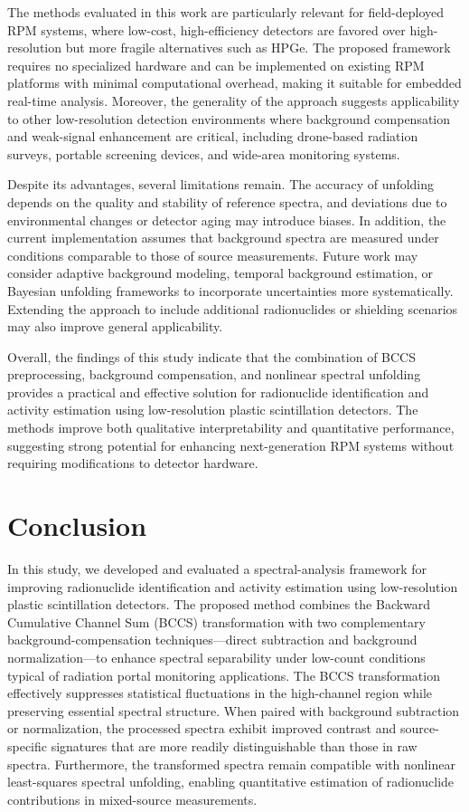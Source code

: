 \documentclass[10pt]{wlscirep}
\begin{document}
The methods evaluated in this work are particularly relevant for field-deployed RPM systems, where low-cost, high-efficiency detectors are favored over high-resolution but more fragile alternatives such as HPGe. The proposed framework requires no specialized hardware and can be implemented on existing RPM platforms with minimal computational overhead, making it suitable for embedded real-time analysis. Moreover, the generality of the approach suggests applicability to other low-resolution detection environments where background compensation and weak-signal enhancement are critical, including drone-based radiation surveys, portable screening devices, and wide-area monitoring systems.

Despite its advantages, several limitations remain. The accuracy of unfolding depends on the quality and stability of reference spectra, and deviations due to environmental changes or detector aging may introduce biases. In addition, the current implementation assumes that background spectra are measured under conditions comparable to those of source measurements. Future work may consider adaptive background modeling, temporal background estimation, or Bayesian unfolding frameworks to incorporate uncertainties more systematically. Extending the approach to include additional radionuclides or shielding scenarios may also improve general applicability.

Overall, the findings of this study indicate that the combination of BCCS preprocessing, background compensation, and nonlinear spectral unfolding provides a practical and effective solution for radionuclide identification and activity estimation using low-resolution plastic scintillation detectors. The methods improve both qualitative interpretability and quantitative performance, suggesting strong potential for enhancing next-generation RPM systems without requiring modifications to detector hardware.

\section*{Conclusion}

In this study, we developed and evaluated a spectral-analysis framework for improving radionuclide identification and activity estimation using low-resolution plastic scintillation detectors. The proposed method combines the Backward Cumulative Channel Sum (BCCS) transformation with two complementary background-compensation techniques—direct subtraction and background normalization—to enhance spectral separability under low-count conditions typical of radiation portal monitoring applications.
The BCCS transformation effectively suppresses statistical fluctuations in the high-channel region while preserving essential spectral structure. When paired with background subtraction or normalization, the processed spectra exhibit improved contrast and source-specific signatures that are more readily distinguishable than those in raw spectra. Furthermore, the transformed spectra remain compatible with nonlinear least-squares spectral unfolding, enabling quantitative estimation of radionuclide contributions in mixed-source measurements.
\end{document}
